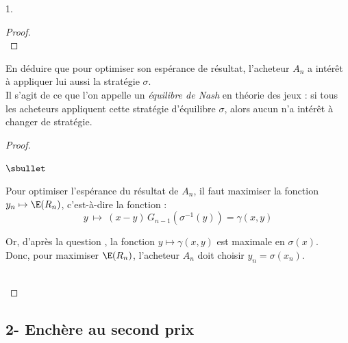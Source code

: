 \documentclass[11pt]{article}%
\begin{document}
\begin{noliste}{1.}
\begin{proof}
    ~\\[-1.4cm]
  \end{proof}
  
  \item En déduire que pour optimiser son espérance de résultat, 
  l'acheteur $A_n$ a intérêt à appliquer lui aussi la stratégie 
  $\sigma$.\\
  Il s'agit de ce que l'on appelle un \emph{équilibre de Nash} en 
  théorie des jeux : si tous les acheteurs appliquent cette 
  stratégie d'équilibre $\sigma$, alors aucun n'a intérêt à 
  changer de stratégie.
  
  \begin{proof}~
    \begin{noliste}{$\sbullet$}
      \item Pour optimiser l'espérance du résultat de $A_n$, il faut
      maximiser la fonction $y_n \mapsto \E(R_n)$, c'est-à-dire la 
      fonction :
      \[
        y \ \mapsto \ (x-y) \, G_{n-1}(\sigma^{-1}(y)) = \gamma(x,y)
      \]
      
      \item Or, d'après la question , la fonction 
      $y \mapsto \gamma(x,y)$ est maximale en $\sigma(x)$.\\
      Donc, pour maximiser $\E(R_n)$, l'acheteur $A_n$ doit choisir
      $y_n=\sigma(x_n)$.
    \end{noliste}
    
    ~\\[-1.2cm]
  \end{proof}
\end{noliste}






\subsection*{2- Enchère au second prix}
\end{document}
